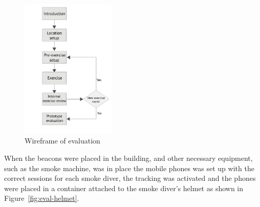 \documentclass[../Main/thesis.tex]{subfiles}
\begin{document}
\begin{figure}[h]
	\centering
	\includegraphics[width=0.4\textwidth]{../fig/eval_wireframe}
	\caption{Wireframe of evaluation}
	\label{fig:eval-wireframe}
\end{figure}

When the beacons were placed in the building, and other necessary equipment, such as the smoke machine, was in place the mobile phones was set up with the correct sessions for each smoke diver, the tracking was activated and the phones were placed in a container attached to the smoke diver's helmet as shown in Figure~\ref{fig:eval-helmet}.
\end{document}
